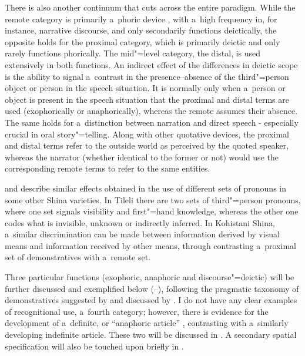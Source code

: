 There is also another continuum that cuts across the entire paradigm. While the remote category is primarily a~phoric device \citep[131]{saxena2006}, with a~high frequency in, for instance, narrative discourse, and only secondarily functions deictically, the opposite holds for the proximal category, which is primarily deictic and only rarely functions phorically. The mid"=level category, the distal, is used extensively in both functions. An indirect effect of the differences in deictic scope is the ability to signal a~contrast in the presence--absence of the third"=person object or person in the speech situation. It is normally only when a~person or object is present in the speech situation that the proximal and distal terms are used (exophorically or anaphorically), whereas the remote assumes their absence. The same holds for a~distinction between narration and direct speech - especially crucial in oral story"=telling. Along with other quotative devices, the proximal and distal terms refer to the outside world as perceived by the quoted speaker, whereas the narrator (whether identical to the former or not) would use the corresponding remote terms to refer to the same entities.



\citet[204--205, 207--212]{schmidt2000} and \citet[134--136]{schmidtkohistani2001} describe similar effects obtained in the use of different sets of pronouns in some other Shina varieties. In Tileli there are two sets of third"=person pronouns, where one set signals visibility and first"=hand knowledge, whereas the other one codes what is invisible, unknown or indirectly inferred. In Kohistani Shina, a~similar discrimination can be made between information derived by visual means and information received by other means, through contrasting a~proximal set of demonstratives with a~remote set. 



Three particular functions (exophoric, anaphoric and discourse"=deictic) will be further discussed and exemplified below (--), following the pragmatic taxonomy of demonstratives suggested by \citet[205--254]{himmelmann1996} and discussed by \citet[432]{diessel2006}. I do not have any clear examples of recognitional use, a~fourth category; however, there is evidence for the development of a~definite, or ``anaphoric article'' \citep[486]{juvonen2006}, contrasting with a~similarly developing indefinite article. These two will be discussed in . A secondary spatial specification will also be touched upon briefly in .


